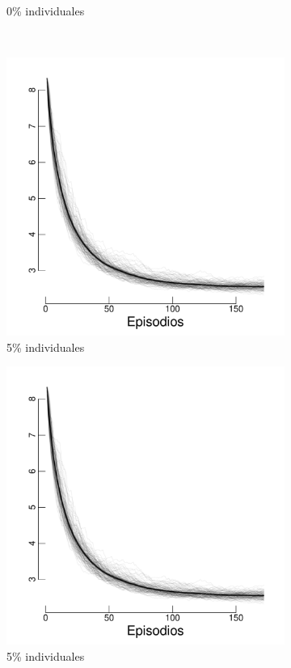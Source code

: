 \documentclass[a4paper,11pt]{book}
\theoremstyle{definition}
\begin{document}
\begin{figure}[H]
\begin{subfigure}[t]{0.32\textwidth}
  \caption{\scriptsize 0\% individuales}\label{H5_lambda}
  \end{subfigure}\\
  \begin{subfigure}[t]{0.32\textwidth}
  \includegraphics[page=3,width=\textwidth]{static/truesynergy/expH6.pdf}
  \caption{\scriptsize 5\% individuales}\label{H6_mu}
  \end{subfigure}
  \begin{subfigure}[t]{0.32\textwidth}
  \includegraphics[page=2,width=\textwidth]{static/truesynergy/expH6.pdf}
  \caption{\scriptsize 5\% individuales}\label{H6_lambda}
  \end{subfigure}
  \caption{}
  \label{fig:sinergia_sin_informacion}
\end{figure}
\end{document}
